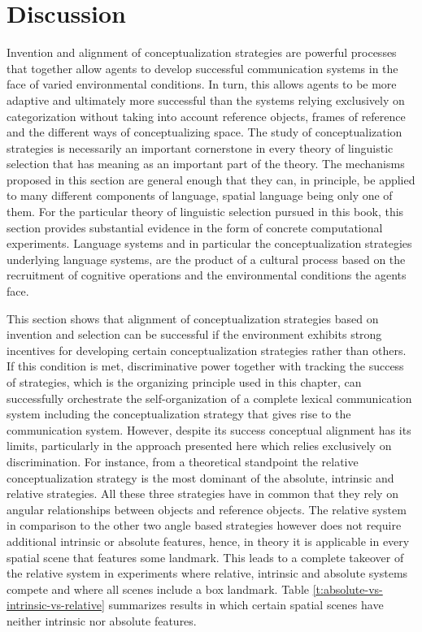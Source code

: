 \section{Discussion}
Invention and alignment of conceptualization strategies are powerful processes that 
together allow agents to develop successful communication systems in the face of
varied environmental conditions. In turn, this allows agents to be more adaptive 
and ultimately more successful than the systems relying exclusively on categorization without 
taking into account reference objects, frames of reference and the different ways
of conceptualizing space. The study of conceptualization strategies is necessarily 
an important cornerstone in every theory of linguistic selection that has meaning as an important
part of the theory. The mechanisms proposed in this section are general enough that they
can, in principle, be applied to many different components of language, spatial language being only 
one of them. For the particular theory of linguistic selection pursued in this book, this 
section provides substantial evidence in the form of concrete computational experiments.
Language systems and in particular the conceptualization strategies underlying language systems, 
are the product of a cultural process based on the recruitment of cognitive operations 
and the environmental conditions the agents face.

This section shows that alignment of conceptualization strategies based on invention and selection
can be successful if the environment exhibits strong incentives for developing certain 
conceptualization strategies rather than others.
If this condition is met, discriminative power together with tracking the success of strategies,
which is the organizing principle used in this chapter,
can successfully orchestrate the self-organization of a complete lexical communication system
including the conceptualization strategy that gives rise to the communication system.
However, despite its success conceptual alignment has its limits, particularly in 
the approach presented here which relies exclusively on discrimination.
For instance, from a theoretical standpoint the relative conceptualization strategy
is the most dominant of the absolute, intrinsic and relative strategies. All these three strategies
have in common that they rely on angular relationships between objects and reference objects. 
The relative system in comparison to the other two angle based strategies however does not require additional 
intrinsic or absolute features, hence, in theory it is applicable in every 
spatial scene that features some landmark. This leads to a complete takeover of the 
relative system in experiments where relative, intrinsic and absolute systems compete
and where all scenes include a box landmark.
Table \ref{t:absolute-vs-intrinsic-vs-relative} summarizes
results in which certain spatial scenes have neither intrinsic nor absolute features.


